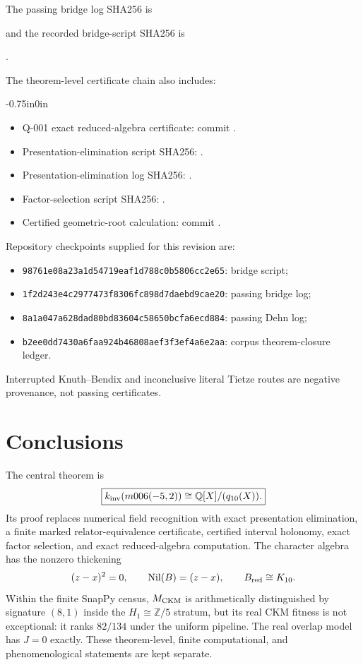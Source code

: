\documentclass[11pt]{article}
\newcommand{\Q}{\mathbb Q}\newcommand{\Z}{\mathbb Z}\newcommand{\C}{\mathbb C}
\newcommand{\M}{M_{\rm CKM}}\newcommand{\K}{K_{10}}\newcommand{\kinv}{k_{\rm inv}}
\begin{document}
The passing bridge log SHA256 is
\begin{center}
\small{}
\end{center}
and the recorded bridge-script SHA256 is
\begin{center}
\small{}.
\end{center}
The theorem-level certificate chain also includes:
\begin{adjustwidth}{-0.75in}{0in}
\small
\begin{itemize}[leftmargin=1.45em]
\item Q-001 exact reduced-algebra certificate: commit .
\item Presentation-elimination script SHA256:
.
\item Presentation-elimination log SHA256:
.
\item Factor-selection script SHA256:
.
\item Certified geometric-root calculation: commit .
\end{itemize}
\end{adjustwidth}

Repository checkpoints supplied for this revision are:
\begin{itemize}
\item \texttt{98761e08a23a1d54719eaf1d788c0b5806cc2e65}: bridge script;
\item \texttt{1f2d243e4c2977473f8306fc898d7daebd9cae20}: passing bridge log;
\item \texttt{8a1a047a628dad80bd83604c58650bcfa6ecd884}: passing Dehn log;
\item \texttt{b2ee0dd7430a6faa924b46808aef3f3ef4a6e2aa}: corpus theorem-closure ledger.
\end{itemize}
Interrupted Knuth--Bendix and inconclusive literal Tietze routes are
negative provenance, not passing certificates.

\section{Conclusions}
The central theorem is
\[
\boxed{\kinv(m006(-5,2))\cong\Q[X]/(q_{10}(X)).}
\]
Its proof replaces numerical field recognition with exact presentation
elimination, a finite marked relator-equivalence certificate, certified
interval holonomy, exact factor selection, and exact reduced-algebra
computation. The character algebra has the nonzero thickening
\[
(z-x)^2=0,\qquad\operatorname{Nil}(B)=(z-x),\qquad B_{\rm red}\cong K_{10}.
\]
Within the finite SnapPy census, $\M$ is arithmetically distinguished by
signature $(8,1)$ inside the $H_1\cong\Z/5$ stratum, but its real CKM
fitness is not exceptional: it ranks $82/134$ under the uniform pipeline.
The real overlap model has $J=0$ exactly. These theorem-level, finite
computational, and phenomenological statements are kept separate.
\end{document}
